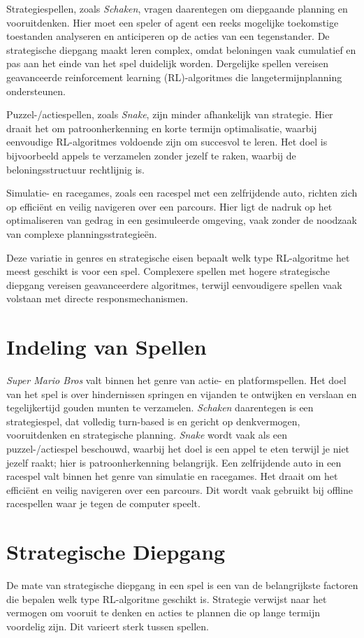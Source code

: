 \documentclass[a4paper,12pt]{report}
\begin{document}
Strategiespellen, zoals \textit{Schaken}, vragen daarentegen om diepgaande
planning en vooruitdenken. Hier moet een speler of agent een reeks mogelijke
toekomstige toestanden analyseren en anticiperen op de acties van een
tegenstander. De strategische diepgang maakt leren complex, omdat beloningen
vaak cumulatief en pas aan het einde van het spel duidelijk worden. Dergelijke
spellen vereisen geavanceerde reinforcement learning (RL)-algoritmes die
langetermijnplanning ondersteunen.

Puzzel-/actiespellen, zoals \textit{Snake}, zijn minder afhankelijk van
strategie. Hier draait het om patroonherkenning en korte termijn optimalisatie,
waarbij eenvoudige RL-algoritmes voldoende zijn om succesvol te leren. Het doel
is bijvoorbeeld appels te verzamelen zonder jezelf te raken, waarbij de
beloningsstructuur rechtlijnig is.

Simulatie- en racegames, zoals een racespel met een zelfrijdende auto, richten
zich op efficiënt en veilig navigeren over een parcours. Hier ligt de nadruk op
het optimaliseren van gedrag in een gesimuleerde omgeving, vaak zonder de
noodzaak van complexe planningsstrategieën.

Deze variatie in genres en strategische eisen bepaalt welk type RL-algoritme
het meest geschikt is voor een spel. Complexere spellen met hogere strategische
diepgang vereisen geavanceerdere algoritmes, terwijl eenvoudigere spellen vaak
volstaan met directe responsmechanismen.

\section{Indeling van Spellen}
\textit{Super Mario Bros} valt binnen het genre van actie- en platformspellen. Het doel van het spel is over hindernissen springen en vijanden te ontwijken en verslaan en tegelijkertijd gouden munten te verzamelen. \textit{Schaken} daarentegen is een strategiespel, dat volledig turn-based is en gericht op denkvermogen, vooruitdenken en strategische planning. \textit{Snake} wordt vaak als een puzzel-/actiespel beschouwd, waarbij het doel is een appel te eten terwijl je niet jezelf raakt; hier is patroonherkenning belangrijk. Een zelfrijdende auto in een racespel valt binnen het genre van simulatie en racegames. Het draait om het efficiënt en veilig navigeren over een parcours. Dit wordt vaak gebruikt bij offline racespellen waar je tegen de computer speelt.

\section{Strategische Diepgang}
De mate van strategische diepgang in een spel is een van de belangrijkste
factoren die bepalen welk type RL-algoritme geschikt is. Strategie verwijst
naar het vermogen om vooruit te denken en acties te plannen die op lange
termijn voordelig zijn. Dit varieert sterk tussen spellen.
\end{document}
